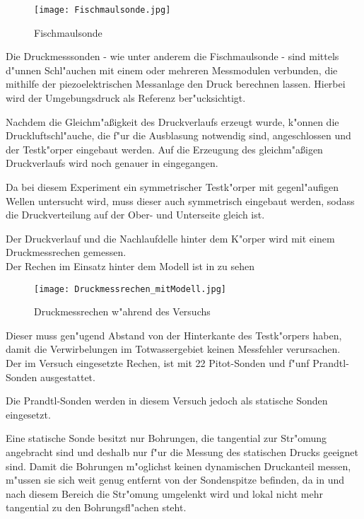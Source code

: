 \begin{figure}[h]
	\centering
	\texttt{[image: Fischmaulsonde.jpg]}
	\caption{Fischmaulsonde}
	\label{fig:Fischmaulsonde}
\end{figure}

Die Druckmesssonden - wie unter anderem die Fischmaulsonde - sind mittels d"unnen Schl"auchen mit einem oder mehreren Messmodulen verbunden, die mithilfe der piezoelektrischen Messanlage den Druck berechnen lassen. Hierbei wird der Umgebungsdruck als Referenz ber"ucksichtigt.

Nachdem die Gleichm"a\ss{}igkeit des Druckverlaufs erzeugt wurde, k"onnen die Druckluftschl"auche, die f"ur die Ausblasung notwendig sind, angeschlossen und der Testk"orper eingebaut werden. Auf die Erzeugung des gleichm"a\ss{}igen Druckverlaufs wird noch genauer in  eingegangen.

Da bei diesem Experiment ein symmetrischer Testk"orper mit gegenl"aufigen Wellen untersucht wird, muss dieser auch symmetrisch eingebaut werden, sodass die Druckverteilung auf der Ober- und Unterseite gleich ist.

Der Druckverlauf und die Nachlaufdelle hinter dem K"orper wird mit einem Druckmessrechen gemessen.\\
Der Rechen im Einsatz hinter dem Modell ist in  zu sehen
\begin{figure}[h]
	\centering
	\texttt{[image: Druckmessrechen\_mitModell.jpg]}
	\caption{Druckmessrechen w"ahrend des Versuchs}
	\label{fig:Druckmessrechen}
\end{figure}
Dieser muss gen"ugend Abstand von der Hinterkante des Testk"orpers haben, damit die Verwirbelungen im Totwassergebiet keinen Messfehler verursachen.\\
Der im Versuch eingesetzte Rechen, ist mit 22 Pitot-Sonden und f"unf Prandtl-Sonden ausgestattet.

Die Prandtl-Sonden werden in diesem Versuch jedoch als statische Sonden eingesetzt.

Eine statische Sonde besitzt nur Bohrungen, die tangential zur Str"omung angebracht sind und deshalb nur f"ur die Messung des statischen Drucks geeignet sind.
Damit die Bohrungen m"oglichst keinen dynamischen Druckanteil messen, m"ussen sie sich weit genug entfernt von der Sondenspitze befinden, da in und nach diesem Bereich die Str"omung umgelenkt wird und lokal nicht mehr tangential zu den Bohrungsfl"achen steht.

